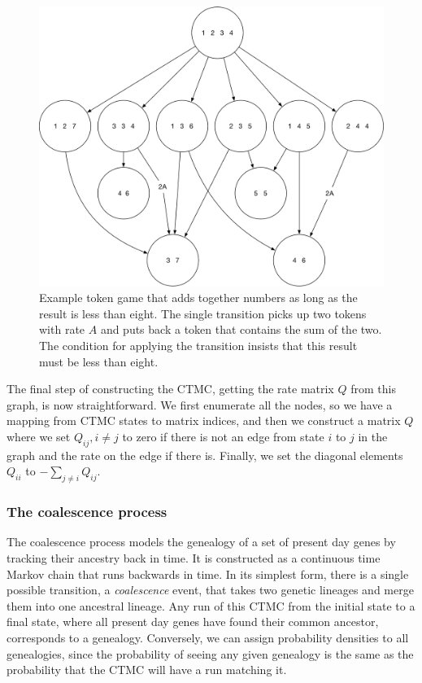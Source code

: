 \documentclass[graybox]{svmult}
\begin{document}
\begin{figure}[t]
\sidecaption[t]
\includegraphics[scale=.30]{figures/example-state-space-graph}
\caption{Example token game that adds together numbers as long as the result is less than eight. The single transition picks up two tokens with rate $A$ and puts back a token that contains the sum of the two. The condition for applying the transition insists that this result must be less than eight.}
\label{fig:example-state-space-graph}
\end{figure}

The final step of constructing the CTMC, getting the rate matrix $Q$ from this graph, is now straightforward. We first enumerate all the nodes, so we have a mapping from CTMC states to matrix indices, and then we construct a matrix $Q$ where we set $Q_{ij}, i\neq j$ to zero if there is not an edge from state $i$ to $j$ in the graph and the rate on the edge if there is. Finally, we set the diagonal elements $Q_{ii}$ to $-\sum_{j \neq i} Q_{ij}$.



\subsubsection{The coalescence process}

The coalescence process \cite{Hein:2004ta} models the genealogy of a set of present day genes by tracking their ancestry back in time. It is constructed as a continuous time Markov chain that runs backwards in time. In its simplest form, there is a single possible transition, a \emph{coalescence} event, that takes two genetic lineages and merge them into one ancestral lineage. Any run of this CTMC from the initial state to a final state, where all present day genes have found their common ancestor, corresponds to a genealogy. Conversely, we can assign probability densities to all genealogies, since the probability of seeing any given genealogy is the same as the probability that the CTMC will have a run matching it.
\end{document}
